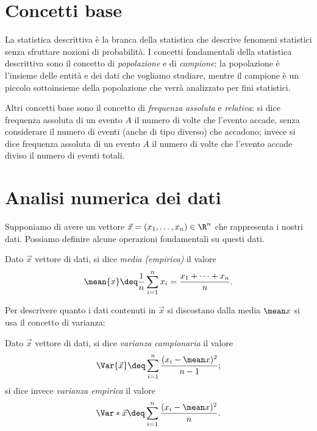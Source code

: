 \section{Concetti base}

La statistica descrittiva è la branca della statistica che descrive fenomeni statistici senza sfruttare nozioni di probabilità. I concetti fondamentali della statistica descrittiva sono il concetto di \emph{popolazione} e di \emph{campione}: la popolazione è l'insieme delle entità e dei dati che vogliamo studiare, mentre il campione è un piccolo sottoinsieme della popolazione che verrà analizzato per fini statistici.

Altri concetti base sono il concetto di \emph{frequenza assoluta} e \emph{relativa}: si dice frequenza assoluta di un evento $A$ il numero di volte che l'evento accade, senza considerare il numero di eventi (anche di tipo diverso) che accadono; invece si dice frequenza assoluta di un evento $A$ il numero di volte che l'evento accade diviso il numero di eventi totali.

\section{Analisi numerica dei dati}

Supponiamo di avere un vettore $\vec{x} = (x_1, \dots, x_n) \in \R^n$ che rappresenta i nostri dati. Possiamo definire alcune operazioni fondamentali su questi dati.

\begin{definition}
     Dato $\vec x$ vettore di dati, si dice \emph{media (empirica)} il valore \begin{equation}
        \mean{x} \deq \frac{1}{n}\sum_{i=1}^n x_i = \frac{x_1 + \dots + x_n}{n}.
    \end{equation}
\end{definition}

Per descrivere quanto i dati contenuti in $\vec x$ si discostano dalla media $\mean x$ si usa il concetto di varianza:
\begin{definition}
    [Varianza] Dato $\vec x$ vettore di dati, si dice \emph{varianza campionaria} il valore \begin{equation}
        \Var{\vec x} \deq \sum_{i=1}^n \frac{(x_i - \mean x)^2}{n-1};
    \end{equation} si dice invece \emph{varianza empirica} il valore \begin{equation}
        \Var*{\vec x} \deq \sum_{i=1}^n \frac{(x_i - \mean x)^2}{n}.
    \end{equation}
\end{definition}

